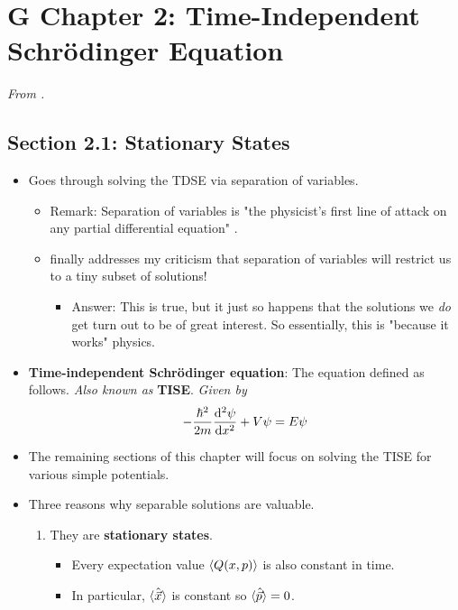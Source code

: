 \documentclass[../notes.tex]{subfiles}
\begin{document}
\section{G Chapter 2: Time-Independent Schr\"{o}dinger Equation}
\emph{From \textcite{bib:Griffiths}.}
\subsection*{Section 2.1: Stationary States}
\begin{itemize}
    \item Goes through solving the TDSE via separation of variables.
    \begin{itemize}
        \item Remark: Separation of variables is "the physicist's first line of attack on any partial differential equation" \parencite[43]{bib:Griffiths}.
        \item \textcite{bib:Griffiths} finally addresses my criticism that separation of variables will restrict us to a tiny subset of solutions!
        \begin{itemize}
            \item Answer: This is true, but it just so happens that the solutions we \emph{do} get turn out to be of great interest. So essentially, this is "because it works" physics.
        \end{itemize}
    \end{itemize}
    \item \textbf{Time-independent Schr\"{o}dinger equation}: The equation defined as follows. \emph{Also known as} \textbf{TISE}. \emph{Given by}
    \begin{equation*}
        -\frac{\hbar^2}{2m}\dv[2]{\psi}{x}+V\psi = E\psi
    \end{equation*}
    \item The remaining sections of this chapter will focus on solving the TISE for various simple potentials.
    \item Three reasons why separable solutions are valuable.
    \begin{enumerate}
        \item They are \textbf{stationary states}.
        \begin{itemize}
            \item Every expectation value $\langle{Q(x,p)}\rangle$ is also constant in time.
            \item In particular, $\langle{\hat{\vec{x}}}\rangle$ is constant so $\langle{\hat{\vec{p}}}\rangle=0$.
        \end{itemize}

\end{enumerate}
\end{itemize}
\end{document}
